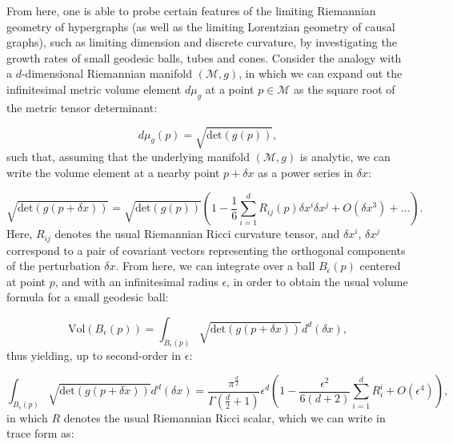 \documentclass{article}
\begin{document}
From here, one is able to probe certain features of the limiting Riemannian geometry of hypergraphs (as well as the limiting Lorentzian geometry of causal graphs), such as limiting dimension and discrete curvature, by investigating the growth rates of small geodesic balls, tubes and cones. Consider the analogy with a $d$-dimensional Riemannian manifold ${\left( \mathcal{M}, g \right)}$, in which we can expand out the infinitesimal metric volume element ${d \mu_g}$ at a point ${p \in \mathcal{M}}$ as the square root of the metric tensor determinant\cite{jost}\cite{gray}:

\begin{equation}
d \mu_g \left( p \right) = \sqrt{\mathrm{det} \left( g \left( p \right) \right)},
\end{equation}
such that, assuming that the underlying manifold ${\left( \mathcal{M}, g \right)}$ is analytic, we can write the volume element at a nearby point ${p + \delta x}$ as a power series in ${\delta x}$:

\begin{equation}
\sqrt{\mathrm{det} \left( g \left( p + \delta x \right) \right)} = \sqrt{\mathrm{det} \left( g \left( p \right) \right)} \left( 1 - \frac{1}{6} \sum_{i = 1}^{d} R_{i j} \left( p \right) \delta x^i \delta x^j + O \left( \delta x^3 \right) + \dots \right).
\end{equation}
Here, ${R_{i j}}$ denotes the usual Riemannian Ricci curvature tensor, and ${\delta x^i}$, ${\delta x^j}$ correspond to a pair of covariant vectors representing the orthogonal components of the perturbation ${\delta x}$. From here, we can integrate over a ball ${B_{\epsilon} \left( p \right)}$ centered at point $p$, and with an infinitesimal radius ${\epsilon}$, in order to obtain the usual volume formula for a small geodesic ball:

\begin{equation}
\mathrm{Vol} \left( B_{\epsilon} \left( p \right) \right) = \int_{B_{\epsilon} \left( p \right)} \sqrt{\mathrm{det} \left( g \left( p + \delta x \right) \right)} d^d \left( \delta x \right),
\end{equation}
thus yielding, up to second-order in ${\epsilon}$:

\begin{equation}
\int_{B_{\epsilon} \left( p \right)} \sqrt{\mathrm{det} \left( g \left( p + \delta x \right) \right)} d^d \left( \delta x \right) = \frac{\pi^{\frac{d}{2}}}{\Gamma \left( \frac{d}{2} + 1 \right)} \epsilon^d \left( 1 - \frac{\epsilon^2}{6 \left( d + 2 \right)} \sum_{i = 1}^{d} R_{i}^{i} + O \left( \epsilon^4 \right) \right),
\end{equation}
in which $R$ denotes the usual Riemannian Ricci scalar, which we can write in trace form as:
\end{document}
